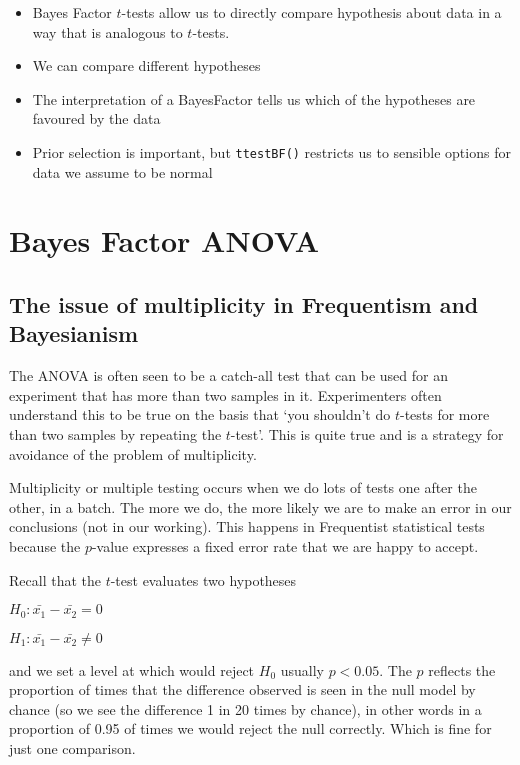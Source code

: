 \documentclass[
]{book}
\providecommand{\tightlist}{%
  \setlength{\itemsep}{0pt}\setlength{\parskip}{0pt}}
\newenvironment{roundup}
{ \begin{tcolorbox}[colbacktitle=yellow!50!white,
title=Round Up,coltitle=black,
fonttitle=\bfseries] }
{  \end{tcolorbox} }
\begin{document}
\begin{roundup}
\begin{itemize}
\tightlist
\item
  Bayes Factor \(t\)-tests allow us to directly compare hypothesis about data in a way that is analogous to \(t\)-tests.
\item
  We can compare different hypotheses
\item
  The interpretation of a BayesFactor tells us which of the hypotheses are favoured by the data
\item
  Prior selection is important, but \texttt{ttestBF()} restricts us to sensible options for data we assume to be normal
\end{itemize}
\end{roundup}

\hypertarget{bayes-factor-anova}{%
\chapter{Bayes Factor ANOVA}\label{bayes-factor-anova}}

\hypertarget{the-issue-of-multiplicity-in-frequentism-and-bayesianism}{%
\section{The issue of multiplicity in Frequentism and Bayesianism}\label{the-issue-of-multiplicity-in-frequentism-and-bayesianism}}

The ANOVA is often seen to be a catch-all test that can be used for an experiment that has more than two samples in it. Experimenters often understand this to be true on the basis that `you shouldn't do \(t\)-tests for more than two samples by repeating the \(t\)-test'. This is quite true and is a strategy for avoidance of the problem of multiplicity.

Multiplicity or multiple testing occurs when we do lots of tests one after the other, in a batch. The more we do, the more likely we are to make an error in our conclusions (not in our working). This happens in Frequentist statistical tests because the \(p\)-value expresses a fixed error rate that we are happy to accept.

Recall that the \(t\)-test evaluates two hypotheses

\(H_0 : \bar{x_1} - \bar{x_2} = 0\)

\(H_1 : \bar{x_1} - \bar{x_2} \neq 0\)

and we set a level at which would reject \(H_0\) usually \(p < 0.05\). The \(p\) reflects the proportion of times that the difference observed is seen in the null model by chance (so we see the difference 1 in 20 times by chance), in other words in a proportion of 0.95 of times we would reject the null correctly. Which is fine for just one comparison.
\end{document}

